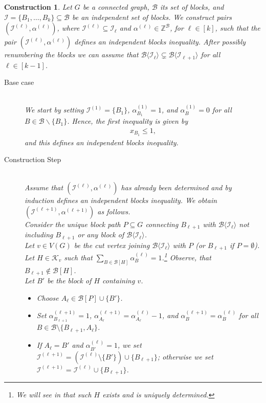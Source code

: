 \documentclass[12pt]{amsart}
\newtheorem{construction}[theorem]{Construction}
\newcommand{\Z}{\mathbb{Z}}
\newcommand{\K}{\mathcal{K}}
\newcommand{\I}{\mathcal{I}}
\newcommand{\B}{\mathcal{B}}
\newcommand{\Xr}[1]{}
\newcommand{\Xn}[1]{{\protect#1}}
\begin{document}
\begin{construction}
\label{construction}
Let $G$ be a connected graph, $\B$ its set of blocks, and $\I=\{B_1,\ldots,B_k\} \subseteq \B$ be an independent set of blocks. We construct pairs $(\I^{(\ell)},\alpha^{(\ell)})$, where $\I^{(\ell)} \subseteq \I_\ell$ and $\alpha^{(\ell)} \in \Z^\B$, for $\ell\in[k]$, such that the pair $(\I^{(\ell)},\alpha^{(\ell)})$ defines an independent blocks inequality. After possibly renumbering the blocks we can assume that $\B \langle\I_\ell \rangle \subsetneq \B \langle \I_{\ell+1} \rangle$ for all $\ell \in [k-1]$.
\begin{description}
    \item[\Xn{Base case}] \, \\ We start by setting $\I^{(1)}=\{B_1\}$, $\alpha^{(1)}_{B_1}=1$, and $\alpha^{(1)}_B=0$ for all $B \in \B \backslash \{B_1\}$. Hence, the first inequality is given by
\begin{align*}
    x_{B_1} \le 1,
\end{align*}
and this defines an independent blocks inequality.
\end{description}

\begin{description}
    \item[\Xn{Construction Step}]\, \\ Assume that $(\I^{(\ell)},\alpha^{(\ell)})$ has already been determined and by induction defines an independent blocks inequality. We obtain $(\I^{(\ell+1)},\alpha^{(\ell+1)})$ as follows. \\
    Consider the unique block path $P \subseteq G$ connecting $B_{\ell+1}$ with $\B\langle\I_\ell\rangle$ not including $B_{\ell+1}$ or any block of $\B\langle\I_\ell\rangle$. \\
    Let $v \in V(G)$ be the cut vertex joining $\B\langle\I_\ell\rangle$ with $P$ (or $B_{\ell+1}$ if $P=\emptyset$). \\
    Let $H \in \K_v$ such that $\sum_{B \in \B[H]} \alpha^{(\ell)}_B=1$.\footnote{\Xn{We will see in  that such $H$ exists and is uniquely determined.}}\Xr{We will see in Lemma 5.7 that such $H$ exists and is uniquely determined.} \Xr{Furthermore, we have}\Xn{Observe, that} $B_{\ell+1} \notin \B[H]$. \\
    Let $B'$ be the block of $H$ containing $v$.
    \begin{itemize}
    \item \Xn{Choose $A_\ell \in \B[P] \cup \{B'\}$}.
    \item \Xr{Let $A_\ell \in \B[P] \cup \{B'\}$ and s}\Xn{S}et $\alpha^{(\ell+1)}_{B_{\ell+1}}=1$, $\alpha^{(\ell+1)}_{A_\ell}=\alpha^{(\ell)}_{A_\ell}-1$, and $\alpha^{(\ell+1)}_{B}=\alpha^{(\ell)}_{B}$ for all $B \in \B \setminus \{B_{\ell+1},A_\ell\}$.
    \item If $A_\ell=B'$ and $\alpha^{(\ell)}_{B'}=1$, we set $\I^{(\ell+1)}=(\I^{(\ell)}\setminus \{B'\})\cup \{B_{\ell+1}\}$; otherwise we set $\I^{(\ell+1)}=\I^{(\ell)}\cup \{B_{\ell+1}\}$.
    \end{itemize}
\end{description}
\end{construction}
\end{document}
